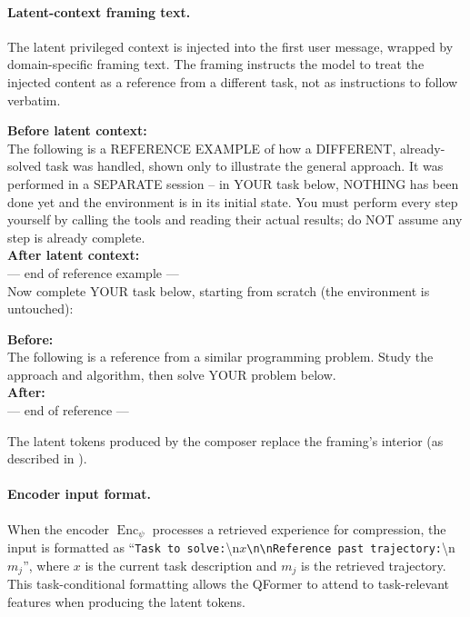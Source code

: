 \documentclass{article} %
\begin{document}
\paragraph{Latent-context framing text.}
The latent privileged context is injected into the first user message, wrapped by domain-specific framing text. The framing instructs the model to treat the injected content as a reference from a different task, not as instructions to follow verbatim.

\begin{tcolorbox}[colback=SeaGreen!6, colframe=SeaGreen!50!black, fontupper=\ttfamily\scriptsize, boxrule=0.5pt, left=4pt, right=4pt, top=3pt, bottom=3pt, title={\small\bfseries Agentic privileged-context framing (EnvScaler)}]
\textbf{Before latent context:}\\
The following is a REFERENCE EXAMPLE of how a DIFFERENT, already-solved task was handled, shown only to illustrate the general approach. It was performed in a SEPARATE session -- in YOUR task below, NOTHING has been done yet and the environment is in its initial state. You must perform every step yourself by calling the tools and reading their actual results; do NOT assume any step is already complete.\\[0.3em]
\textbf{After latent context:}\\
--- end of reference example ---\\
Now complete YOUR task below, starting from scratch (the environment is untouched):
\end{tcolorbox}

\begin{tcolorbox}[colback=SeaGreen!6, colframe=SeaGreen!50!black, fontupper=\ttfamily\scriptsize, boxrule=0.5pt, left=4pt, right=4pt, top=3pt, bottom=3pt, title={\small\bfseries Coding privileged-context framing (TACO)}]
\textbf{Before:}\\
The following is a reference from a similar programming problem. Study the approach and algorithm, then solve YOUR problem below.\\[0.3em]
\textbf{After:}\\
--- end of reference ---
\end{tcolorbox}

The latent tokens produced by the composer replace the framing's interior (as described in ).

\paragraph{Encoder input format.}
When the encoder $\operatorname{Enc}_\psi$ processes a retrieved experience for compression, the input is formatted as ``\texttt{Task to solve:}\textbackslash n$x$\texttt{\textbackslash n\textbackslash nReference past trajectory:}\textbackslash n$m_j$'', where $x$ is the current task description and $m_j$ is the retrieved trajectory. This task-conditional formatting allows the QFormer to attend to task-relevant features when producing the latent tokens.
\end{document}
